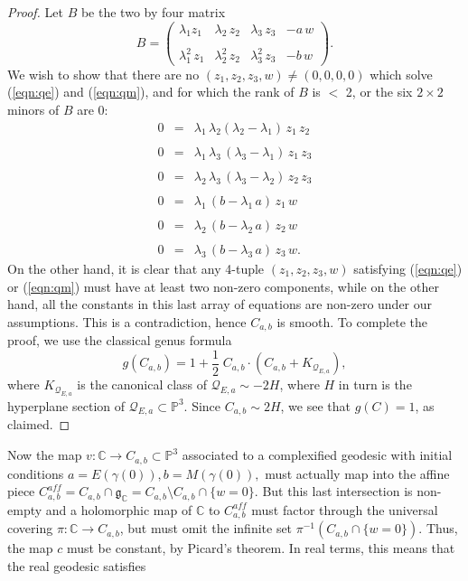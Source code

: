 \documentclass[12pt,reqno]{amsart}\usepackage{amssymb,amsmath,amscd,epsfig,amsthm,enumerate,import,eufrak}
\theoremstyle{definition}
\theoremstyle{remark}
\numberwithin{equation}{section}
\theoremstyle{plain}
\theoremstyle{definition}
\def \c {\mathbb{C}}
\def \p {\mathbb{P}}
\def \q {\mathcal{Q}}
\def \mfg {\mathfrak{g}}
\def \vs {\vskip 2mm}
\theoremstyle{remark}
\numberwithin{theorem}{section}
\begin{document}
\begin{proof} Let $B$ be the two by four matrix
%
\[
	B = \left(\begin{array}{cccc} \lambda_1 z_1 & \lambda_2 \, z_2 & \lambda_3 \, z_3 & - a \, w \\	& & & \\ \lambda_1^2 \, z_1 & \lambda_2^2 \, z_2 & \lambda_3^2 \, z_3 & - b \, w \end{array} \right).
\]  
%
%
We wish to show that there are no $(z_1, z_2, z_3, w) \neq (0,0,0,0)$ which solve (\ref{eqn:qe}) and (\ref{eqn:qm}), and for which the rank of $B$ is $<$ 2, or the six $2\times 2$ minors of $B$ are 0:
%
\[
\begin{array}{rcl} 
	0 & = & \lambda_1 \, \lambda_2 (\lambda_2 - \lambda_1) \, z_1 \, z_2 \\
	\\
	0 & = & \lambda_1 \, \lambda_3 \,(\lambda_3 - \lambda_1)\, z_1\, z_3 \\
	\\
	0 & = & \lambda_2 \, \lambda_3 \, (\lambda_3 - \lambda_2)\, z_2 \, z_3 \\
	\\
	0 & = & \lambda_1\, (b - \lambda_1 \, a) \, z_1 \, w\\
	\\
	0 & = & \lambda_2 \, (b - \lambda_2 \, a) \, z_2 \, w \\
	\\
	0 & = & \lambda_3 \, (b - \lambda_3 \, a) \, z_3 \, w.
\end{array}
\]
%
On the other hand, it is clear that any 4-tuple $(z_1, z_2, z_3, w)$ satisfying (\ref{eqn:qe}) or (\ref{eqn:qm}) must have at least two non-zero components, while on the other hand, all the constants in this last array of equations are non-zero under our assumptions. This is a contradiction, hence $C_{a,b}$ is smooth.
\vs
To complete the proof, we use the classical genus formula
%
\[
	g(C_{a,b}) = 1 + \frac12 \; C_{a,b} \cdot (C_{a,b} + K_{\q_{E,a}}),
\]
%
where $K_{\q_{E,a}}$ is the canonical class of $\q_{E,a} \sim -2 H$, where $H$ in turn is the hyperplane section of $\q_{E,a} \subset \p^3$. Since $C_{a,b} \sim 2 H$, we see that $g(C) = 1$, as claimed.
%
\vs
%
%
\end{proof}
%
Now the map $v: \c \to C_{a,b} \subset \p^3$ associated to a complexified geodesic with initial conditions $a = E(\gamma(0)), b = M(\gamma(0)),$ must actually map into the affine piece $C^{{aff}}_{a,b} = C_{a,b} \cap \mfg_{\c} = C_{a,b} \setminus C_{a,b} \cap \{w = 0\}$. But this last intersection is non-empty and a holomorphic map of $\c$ to $C^{aff}_{a,b}$ must factor through the universal covering $\pi: \mathbb{C} \to C_{a,b}$, but must omit the infinite set $\pi^{-1}(C_{a,b} \cap\{w = 0\})$. Thus, the map $c$ must be constant, by Picard's theorem. In real terms, this means that the real geodesic satisfies
\end{document}
